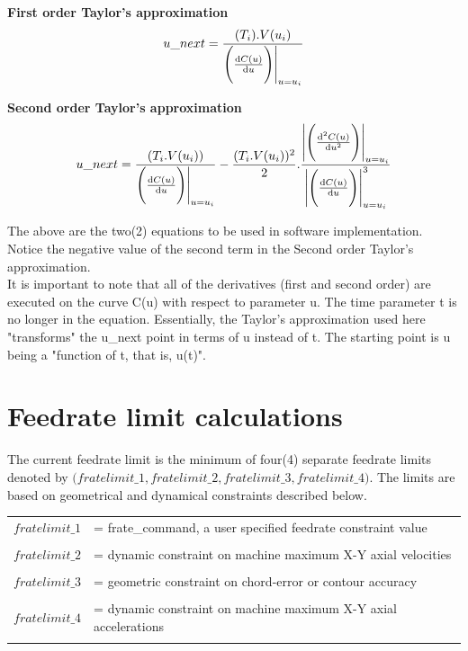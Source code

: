 \textbf{First order Taylor's approximation}
\[ u\_next = \frac {(T_{i}).V(u_{i})} {\Bigg ( \odv{C(u)}{u} \Bigg ) \Bigg |_{u=u_{i}} } \]
\vspace{0.5cm}

\textbf{Second order Taylor's approximation}
\[ u\_next =  \frac{(T_{i}.V(u_{i}))} {\Bigg ( \odv{C(u)}{u} \Bigg ) \Bigg |_{u=u_{i}}} - \frac{ (T_{i}.V(u_{i})) ^{2}}{2}. \frac{ \Bigg | {\Bigg ( \frac{\mathrm{d^2}C(u)}{\mathrm{d}u^2} \Bigg ) \Bigg |_{u=u_{i}} } }{ \Bigg | {\Bigg ( \odv{C(u)}{u} \Bigg ) \Bigg |_{u=u_{i}} ^{3} } } \]
\vspace{0.5cm}

The above are the two(2) equations to be used in software implementation. Notice the negative value of the second term in the Second order Taylor's approximation. \\

It is important to note that all of the derivatives (first and second order) are executed on the curve C(u) with respect to  parameter u. The time parameter t is no longer in the equation. Essentially, the Taylor's approximation used here "transforms" the u\_next point in terms of u instead of t. The starting point is u being a "function of t, that is, u(t)".\\




\clearpage
\pagebreak

\section{Feedrate limit calculations}

The current feedrate limit is the minimum of four(4) separate feedrate limits denoted by $ \Big (fratelimit\_1, fratelimit\_2, fratelimit\_3, fratelimit\_4 \Big)$. The limits are based on geometrical and dynamical constraints described below. \\

\begin{table}[!ht]
\begin{center}
\begin{tabular}{ p{2.0cm} p{13.0cm} }
    $fratelimit\_1$ & = frate\_command, a user specified feedrate constraint value\\   
& \\
	$fratelimit\_2$ & = dynamic constraint on machine maximum X-Y axial velocities \\   
& \\
	$fratelimit\_3$ & = geometric constraint on chord-error or contour accuracy \\   
& \\
	$fratelimit\_4$ & = dynamic constraint on machine maximum X-Y axial accelerations \\   
& \\
\end{tabular}
\end{center}
\end{table}


